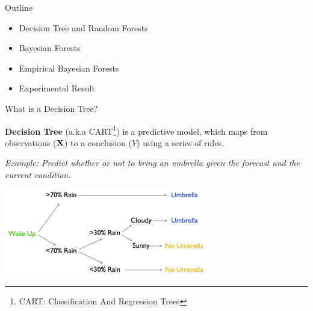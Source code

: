 \documentclass[11pt,xcolor=svgnames]{beamer}
\newcommand{\theme}{\color{Maroon}}
\begin{document}

\setcounter{page}{0}
{%
 }


\begin{frame}
{Outline}

\begin{itemize}
\item Decision Tree and Random Forests
\item Bayesian Forests
\item Empirical Bayesian Forests
\item Experimental Result
\end{itemize}

\end{frame}


\begin{frame}
{What is a Decision Tree?}

{\bf Decision Tree} (a.k.a CART\footnote[frame]{CART: Classification And Regression Trees}) is a predictive model, which maps from observations ($\bf{X}$) to a conclusion ($Y$) using a series of rules.\\
\vskip 0.5cm

\textit{Example: Predict whether or not to bring an umbrella given the forecast and the current condition.}

\vskip 0.5cm
\includegraphics[width=3.50in]{../graphs/umbrella}



\end{frame}
\end{document}

